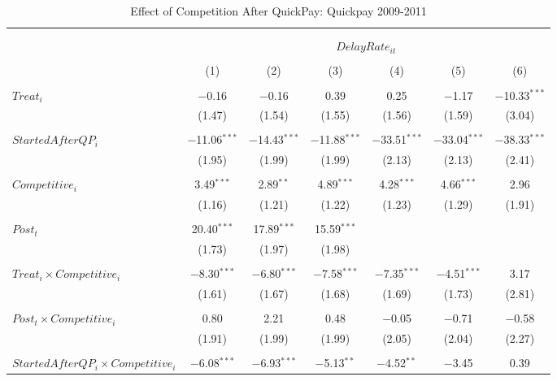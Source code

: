 \documentclass[
]{article}
\begin{document}
\begin{table}[H] \centering 
  \caption{Effect of Competition After QuickPay: Quickpay 2009-2011} 
  \label{} 
\small 
\begin{tabular}{@{\extracolsep{-3pt}}lcccccc} 
\\[-1.8ex]\hline 
\hline \\[-1.8ex] 
\\[-1.8ex] & \multicolumn{6}{c}{$DelayRate_{it}$  } \\ 
\\[-1.8ex] & (1) & (2) & (3) & (4) & (5) & (6)\\ 
\hline \\[-1.8ex] 
 $Treat_i$ & $-$0.16 & $-$0.16 & 0.39 & 0.25 & $-$1.17 & $-$10.33$^{***}$ \\ 
  & (1.47) & (1.54) & (1.55) & (1.56) & (1.59) & (3.04) \\ 
  & & & & & & \\ 
 $StartedAfterQP_i$ & $-$11.06$^{***}$ & $-$14.43$^{***}$ & $-$11.88$^{***}$ & $-$33.51$^{***}$ & $-$33.04$^{***}$ & $-$38.33$^{***}$ \\ 
  & (1.95) & (1.99) & (1.99) & (2.13) & (2.13) & (2.41) \\ 
  & & & & & & \\ 
 $Competitive_i$ & 3.49$^{***}$ & 2.89$^{**}$ & 4.89$^{***}$ & 4.28$^{***}$ & 4.66$^{***}$ & 2.96 \\ 
  & (1.16) & (1.21) & (1.22) & (1.23) & (1.29) & (1.91) \\ 
  & & & & & & \\ 
 $Post_t$ & 20.40$^{***}$ & 17.89$^{***}$ & 15.59$^{***}$ &  &  &  \\ 
  & (1.73) & (1.97) & (1.98) &  &  &  \\ 
  & & & & & & \\ 
 $Treat_i \times Competitive_i$ & $-$8.30$^{***}$ & $-$6.80$^{***}$ & $-$7.58$^{***}$ & $-$7.35$^{***}$ & $-$4.51$^{***}$ & 3.17 \\ 
  & (1.61) & (1.67) & (1.68) & (1.69) & (1.73) & (2.81) \\ 
  & & & & & & \\ 
 $Post_t \times Competitive_i$ & 0.80 & 2.21 & 0.48 & $-$0.05 & $-$0.71 & $-$0.58 \\ 
  & (1.91) & (1.99) & (1.99) & (2.05) & (2.04) & (2.27) \\ 
  & & & & & & \\ 
 $StartedAfterQP_i \times Competitive_i$ & $-$6.08$^{***}$ & $-$6.93$^{***}$ & $-$5.13$^{**}$ & $-$4.52$^{**}$ & $-$3.45 & 0.39 \\ 

\end{tabular}
\end{table}
\end{document}
